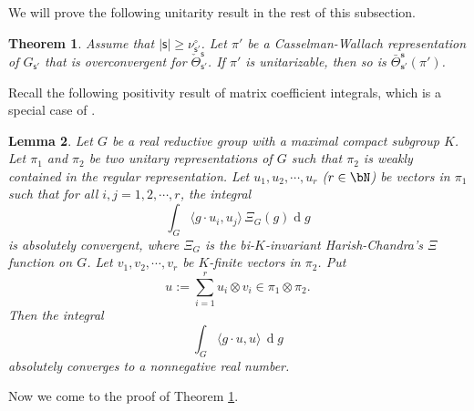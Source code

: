 \documentclass[12pt,a4paper]{amsart}
\def\abs#1{\left|{#1}\right|}
\newcommand{\od}{\operatorname{d}}
\newcommand{\la}{\langle}
\newcommand{\ra}{\rangle}
\numberwithin{equation}{section}
\newtheorem{thm}{Theorem}[section]
\newtheorem{lem}[thm]{Lemma}
\theoremstyle{remark}
\def\Thetab{\bar{\Theta}}
\begin{document}
We will prove the  following unitarity result in  the rest of this subsection.
\begin{thm}\label{positivity000}
Assume that $\abs{\mathsf s}\geq \nu^\circ_{\mathsf s'}$. Let $\pi'$ be a Casselman-Wallach representation of $G_{\mathsf s'}$ that is overconvergent  for $\check \Theta_{\mathsf s'}^{\mathsf s}$. If $\pi'$ is unitarizable, then so is $\Thetab_{\mathbf s'}^{\mathbf s}(\pi')$.
\end{thm}



Recall the following positivity result of matrix coefficient integrals, which is a special case of \cite[Theorem A. 5]{HLS}.

\begin{lem}\label{positivity}
Let $G$ be a real reductive group with a maximal compact subgroup $K$. Let $\pi_1$ and $\pi_2$ be two unitary representations of $G$ such that $\pi_2$ is weakly
contained in the regular representation. Let $u_1, u_2, \cdots, u_r$ ($r\in \bN$) be vectors in $\pi_1$ such that for all $i,j=1,2, \cdots, r$,
the integral
\[
  \int_G \la g\cdot u_i, u_j\ra\,\Xi_G (g) \od\!g %
\]
is absolutely convergent, where  $\Xi_G$ is the bi-$K$-invariant Harish-Chandra's $\Xi$ function on $G$.   Let $v_1,v_2,\cdots, v_r$ be  $K$-finite vectors in $\pi_2$.
Put
\[
u:=\sum_{i=1}^r u_i\otimes v_i\in \pi_1\otimes \pi_2.
\]
Then the integral
\[%
\int_G \la g \cdot u,u \rangle\,\od\! g
\]%
absolutely converges to a nonnegative real number.
\end{lem}


Now we come to the proof of Theorem \ref{positivity000}.


\end{document}
